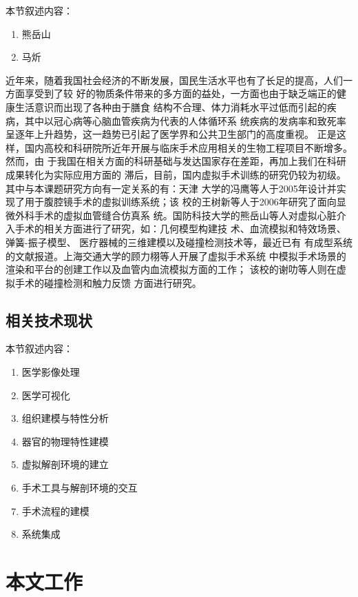 本节叙述内容：
\begin{enumerate}
  \item 熊岳山
  \item 马炘
\end{enumerate}

近年来，随着我国社会经济的不断发展，国民生活水平也有了长足的提高，人们一方面享受到了较
好的物质条件带来的多方面的益处，一方面也由于缺乏端正的健康生活意识而出现了各种由于膳食
结构不合理、体力消耗水平过低而引起的疾病，其中以冠心病等心脑血管疾病为代表的人体循环系
统疾病的发病率和致死率呈逐年上升趋势，这一趋势已引起了医学界和公共卫生部门的高度重视。
正是这样，国内高校和科研院所近年开展与临床手术应用相关的生物工程项目不断增多。然而，由
于我国在相关方面的科研基础与发达国家存在差距，再加上我们在科研成果转化为实际应用方面的
滞后，目前，国内虚拟手术训练的研究仍较为初级。其中与本课题研究方向有一定关系的有：天津
大学的冯鹰\cite{li2005master}等人于2005年设计并实现了用于腹腔镜手术的虚拟训练系统；该
校的王树新等人\cite{zeng2006master}于2006年研究了面向显微外科手术的虚拟血管缝合仿真系
统。国防科技大学的熊岳山等人对虚拟心脏介入手术的相关方面进行了研究，如：几何模型构建技
术\cite{han2005master}、血流模拟和特效场景\cite{ren2005master}、弹簧-振子模型\cite{wang2006master}、
医疗器械的三维建模\cite{zhu2007master}以及碰撞检测技术\cite{kang2007master}等，最近已有
有成型系统的文献报道\cite{tan2012coronary}。上海交通大学的顾力栩等人开展了虚拟手术系统
中模拟手术场景的渲染和平台的创建工作\cite{zheng2008master}以及血管内血流模拟方面的工作\cite{huang2011virtual}；
该校的谢叻等人则在虚拟手术的碰撞检测\cite{wu2010virtual}和触力反馈\cite{wu2011virtual}
方面进行研究。

\subsection{相关技术现状}

本节叙述内容：
\begin{enumerate}
  \item 医学影像处理
  \item 医学可视化
  \item 组织建模与特性分析
  \item 器官的物理特性建模
  \item 虚拟解剖环境的建立
  \item 手术工具与解剖环境的交互
  \item 手术流程的建模
  \item 系统集成
\end{enumerate}

\section{本文工作}

